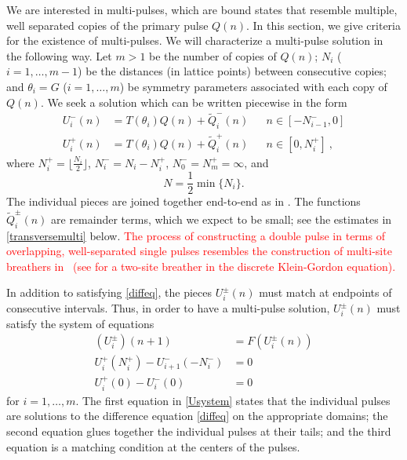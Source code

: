 \documentclass[12pt]{elsarticle}
\newcommand{\revised}[1]{ \textcolor{red}{#1} }
\begin{document}
We are interested in multi-pulses, which are bound states that resemble multiple, well separated copies of the primary pulse $Q(n)$. In this section, we give criteria for the existence of multi-pulses. We will characterize a multi-pulse solution in the following way. Let $m > 1$ be the number of copies of $Q(n)$; $N_i$ ($i = 1, \dots, m-1$) be the distances (in lattice points) between consecutive copies; and $\theta_i = G$ ($i = 1, \dots, m$) be symmetry parameters associated with each copy of $Q(n)$. We seek a solution which can be written piecewise in the form 
\begin{equation}\label{Upiecewise}
\begin{aligned}
U_i^-(n) &= T(\theta_i) Q(n) + \tilde{Q}_i^-(n) && n \in [-N_{i-1}^-, 0] \\
U_i^+(n) &= T(\theta_i) Q(n) + \tilde{Q}_i^+(n) && n \in [0, N_i^+] \:,
\end{aligned}
\end{equation}
where $N_i^+ = \lfloor \frac{N_i}{2} \rfloor$, $N_i^- = N_i - N_i^+$, $N_0^- = N_m^+ = \infty$, and
\begin{equation}\label{defN}
N = \frac{1}{2} \min\{ N_i \}.
\end{equation}
The individual pieces are joined together end-to-end as in \cite{Sandstede1998}. The functions $\tilde{Q}_i^\pm(n)$ are remainder terms, which we expect to be small; see the estimates in \cref{transversemulti} below. \revised{The process of constructing a double pulse in terms of overlapping, well-separated single pulses resembles the construction of multi-site breathers in~\cite{Pelinovsky2012} (see \cite[Lemma 1]{Pelinovsky2012} for a two-site breather in the discrete Klein-Gordon equation).} 

In addition to satisfying \cref{diffeq}, the pieces $U_i^\pm(n)$ must match at endpoints of consecutive intervals. Thus, in order to have a multi-pulse solution, $U_i^\pm(n)$ must satisfy the system of equations
\begin{equation}\label{Usystem}
\begin{aligned}
(U_i^\pm)(n+1) &= F(U_i^\pm(n))  \\
U_i^+(N_i^+) - U_{i+1}^-(-N_i^-) &= 0 \\
U_i^+(0) - U_i^-(0) &= 0
\end{aligned}
\end{equation}
for $i = 1, \dots, m$. The first equation in \cref{Usystem} states that the individual pulses are solutions to the difference equation \cref{diffeq} on the appropriate domains; the second equation glues together the individual pulses at their tails; and the third equation is a matching condition at the centers of the pulses.
\end{document}
